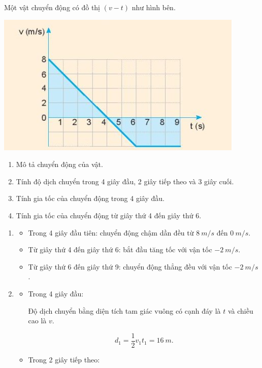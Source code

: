 \begin{enumerate}[label=\bfseries Bài \arabic*:]
	
	{Một vật chuyển động có đồ thị $(v-t)$ như hình bên.
		\begin{center}
			\includegraphics[scale=1]{../figs/VN10-2022-PH-TP012-4.jpg}
		\end{center}
		\begin{enumerate}[label=\alph*)]
			\item Mô tả chuyển động của vật.
			\item Tính độ dịch chuyển trong 4 giây đầu, 2 giây tiếp theo và 3 giây cuối.
			\item Tính gia tốc của chuyển động trong 4 giây đầu.
			\item Tính gia tốc của chuyển động từ giây thứ 4 đến giây thứ 6.
		\end{enumerate}
		
	}
	
	\hideall
	{	\begin{enumerate}[label=\alph*)]
			\item 
			\begin{itemize}
				\item Trong 4 giây đầu tiên: chuyển động chậm dần đều từ  $\SI{8}{m/s}$ đến  $\SI{0}{m/s}$.
				\item Từ giây thứ 4 đến giây thứ 6: bắt đầu tăng tốc với vận tốc  $- \SI{2}{m/s}$.
				\item Từ giây thứ 6 đến giây thứ 9: chuyển động thẳng đều với vận tốc $- \SI{2}{m/s}$.
			\end{itemize}
	\item 
	\begin{itemize}
		\item Trong 4 giây đầu:
		
		Độ dịch chuyển bằng diện tích tam giác vuông có cạnh đáy là $t$ và chiều cao là $v$.
		
		$$d_1 = \dfrac{1}{2}v_1t_1 = \SI{16}{m}.$$
		\item Trong 2 giây tiếp theo:
		

\end{itemize}
\end{enumerate}}
\end{enumerate}

